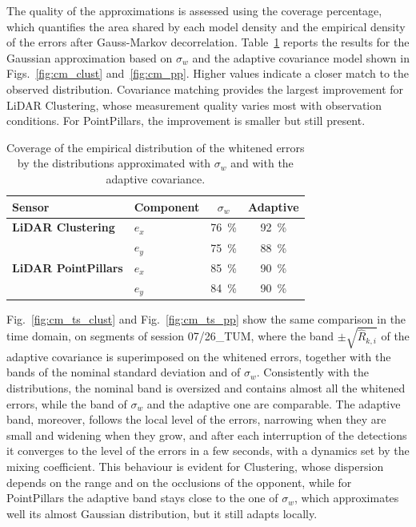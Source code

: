 The quality of the approximations is assessed using the coverage percentage, which
quantifies the area shared by each model density and the empirical density of the errors
after Gauss-Markov decorrelation. Table~\ref{tab:cm_coverage} reports the results for the
Gaussian approximation based on $\sigma_w$ and the adaptive covariance model shown in
Figs.~\ref{fig:cm_clust} and~\ref{fig:cm_pp}. Higher values indicate a closer match to the
observed distribution. Covariance matching provides the largest improvement for LiDAR
Clustering, whose measurement quality varies most with observation conditions. For
PointPillars, the improvement is smaller but still present.

\begin{table}[H]
    \centering
    \small
    \begin{tabular}{|llcc|}
        \hline
        \rowcolor{bluepoli!40} \textbf{Sensor} & \textbf{Component} & \textbf{$\sigma_w$} & \textbf{Adaptive} \\
        \hline\hline
        \textbf{LiDAR Clustering} & $e_x$ & \SI{76}{\percent} & \SI{92}{\percent} \\
                           & $e_y$ & \SI{75}{\percent} & \SI{88}{\percent} \\
        \hline
        \textbf{LiDAR PointPillars} & $e_x$ & \SI{85}{\percent} & \SI{90}{\percent} \\
                           & $e_y$ & \SI{84}{\percent} & \SI{90}{\percent} \\
        \hline
    \end{tabular}
    \caption{Coverage of the empirical distribution of the whitened errors by the
    distributions approximated with $\sigma_w$ and with the adaptive covariance.}
    \label{tab:cm_coverage}
\end{table}

Fig.~\ref{fig:cm_ts_clust} and Fig.~\ref{fig:cm_ts_pp} show the same comparison in the
time domain, on segments of session 07/26\_TUM, where the band $\pm\sqrt{\hat{R}_{k,i}}$ of
the adaptive covariance is superimposed on the whitened errors, together with the bands of
the nominal standard deviation and of $\sigma_w$. Consistently with the distributions, the
nominal band is oversized and contains almost all the whitened errors, while the band of
$\sigma_w$ and the adaptive one are comparable. The adaptive band, moreover, follows the
local level of the errors, narrowing when they are small and widening when they grow, and
after each interruption of the detections it converges to the level of the errors in a few
seconds, with a dynamics set by the mixing coefficient. This behaviour is evident for
Clustering, whose dispersion depends on the range and on the occlusions of the opponent,
while for PointPillars the adaptive band stays close to the one of $\sigma_w$, which
approximates well its almost Gaussian distribution, but it still adapts locally.

